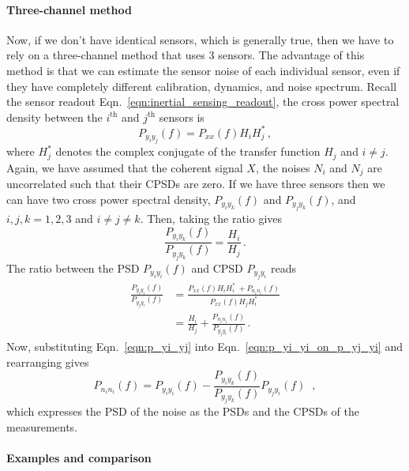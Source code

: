 \paragraph{Three-channel method}

Now, if we don't have identical sensors, which is generally true, then we have to rely on a three-channel method that uses 3 sensors.
The advantage of this method is that we can estimate the sensor noise of each individual sensor, even if they have completely different calibration, dynamics, and noise spectrum.
Recall the sensor readout Eqn.~\eqref{eqn:inertial_sensing_readout}, the cross power spectral density between the $i^\mathrm{th}$ and $j^\mathrm{th}$ sensors is
\begin{equation}
	P_{y_iy_j}(f) = P_{xx}(f)H_iH_j^*\,,
\end{equation}
where $H_j^*$ denotes the complex conjugate of the transfer function $H_j$ and $i\neq j$.
Again, we have assumed that the coherent signal $X$, the noises $N_i$ and $N_j$ are uncorrelated such that their CPSDs are zero.
If we have three sensors then we can have two cross power spectral density, $P_{y_iy_k}(f)$ and $P_{y_jy_k}(f)$, and $i,j,k=1,2,3$ and $i\neq j\neq k$.
Then, taking the ratio gives
\begin{equation}
	\frac{P_{y_iy_k}(f)}{P_{y_jy_k}(f)} = \frac{H_i}{H_j}\,.
	\label{eqn:p_yi_yj}
\end{equation}
The ratio between the PSD $P_{y_iy_i}(f)$ and CPSD $P_{y_jy_i}$ reads
\begin{equation}
	\begin{split}
	\frac{P_{y_iy_i}(f)}{P_{y_jy_i}(f)} &= \frac{P_{xx}(f)H_iH_i^*\ + P_{n_in_i}(f)}{P_{xx}(f)H_jH_i^*} \\
	&= \frac{H_i}{H_j} + \frac{P_{n_in_i}(f)}{P_{y_jy_i}(f)}\,.
	\end{split}
	\label{eqn:p_yi_yi_on_p_yj_yi}
\end{equation}
Now, substituting Eqn.~\eqref{eqn:p_yi_yj} into Eqn.~\eqref{eqn:p_yi_yi_on_p_yj_yi} and rearranging gives
\begin{equation}
	\boxed{
		P_{n_in_i}(f) = P_{y_iy_i}(f) - \frac{P_{y_iy_k}(f)}{P_{y_jy_k}(f)}P_{y_jy_i}(f)\,
	}\,\ ,
	\label{eqn:p_ni_ni_3channel}
\end{equation}
which expresses the PSD of the noise as the PSDs and the CPSDs of the measurements.

\paragraph{Examples and comparison}




